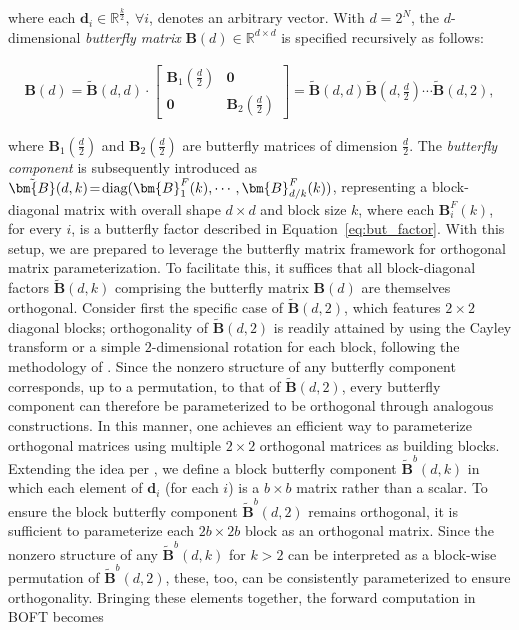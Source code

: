 where each $\bm{d}_i \in \mathbb{R}^{\frac{k}{2}},\ \forall i$, denotes an arbitrary vector. With $d=2^N$, the $d$-dimensional \emph{butterfly matrix} $\bm{B}(d) \in \mathbb{R}^{d\times d}$ is specified recursively as follows:

\begin{equation}
\begin{aligned}
    \bm{B}(d) = \tilde{\bm{B}}(d,d)\cdot\begin{bmatrix}
    \bm{B}_1(\frac{d}{2}) & \bm{0} \\
    \bm{0} & \bm{B}_2(\frac{d}{2})
    \end{bmatrix} = \tilde{\bm{B}}(d,d)\tilde{\bm{B}}(d,\frac{d}{2})\cdots\tilde{\bm{B}}(d,2),
\end{aligned}
\end{equation}

where $\bm{B}_1(\frac{d}{2})$ and $\bm{B}_2(\frac{d}{2})$ are butterfly matrices of dimension $\frac{d}{2}$. The \emph{butterfly component} is subsequently introduced as $\thickmuskip=2mu \medmuskip=2mu \tilde{\bm{B}}(d,k)=\text{diag}(\bm{B}^F_1(k),\cdots,\bm{B}^F_{d/k}(k))$, representing a block-diagonal matrix with overall shape $d\times d$ and block size $k$, where each $\bm{B}^F_i(k)$, for every $i$, is a butterfly factor described in Equation~\ref{eq:but_factor}. With this setup, we are prepared to leverage the butterfly matrix framework for orthogonal matrix parameterization. To facilitate this, it suffices that all block-diagonal factors $\tilde{\bm{B}}(d,k)$ comprising the butterfly matrix $\bm{B}(d)$ are themselves orthogonal. Consider first the specific case of $\tilde{\bm{B}}(d,2)$, which features $2 \times 2$ diagonal blocks; orthogonality of $\tilde{\bm{B}}(d,2)$ is readily attained by using the Cayley transform or a simple $2$-dimensional rotation for each block, following the methodology of \cite{liu2021orthogonal,qiu2023controlling}. Since the nonzero structure of any butterfly component corresponds, up to a permutation, to that of $\tilde{\bm{B}}(d,2)$, every butterfly component can therefore be parameterized to be orthogonal through analogous constructions. In this manner, one achieves an efficient way to parameterize orthogonal matrices using multiple $2\times2$ orthogonal matrices as building blocks. Extending the idea per \cite{chen2022pixelated}, we define a block butterfly component $\tilde{\bm{B}}^b(d,k)$ in which each element of $\bm{d}_i$ (for each $i$) is a $b\times b$ matrix rather than a scalar. To ensure the block butterfly component $\tilde{\bm{B}}^b(d,2)$ remains orthogonal, it is sufficient to parameterize each $2b\times 2b$ block as an orthogonal matrix. Since the nonzero structure of any $\tilde{\bm{B}}^b(d,k)$ for $k > 2$ can be interpreted as a block-wise permutation of $\tilde{\bm{B}}^b(d,2)$, these, too, can be consistently parameterized to ensure orthogonality. Bringing these elements together, the forward computation in BOFT becomes

